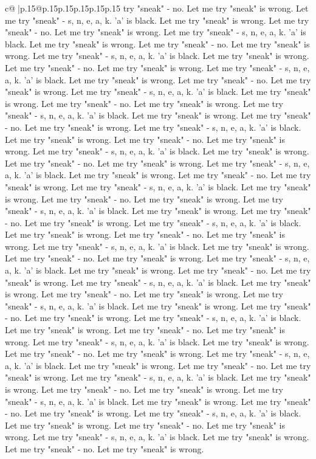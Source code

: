 \documentclass{article}
\begin{document}
{\begin{supertabular}{c@{$\;$}|p{.15\linewidth}@{}p{.15\linewidth}p{.15\linewidth}p{.15\linewidth}p{.15\linewidth}p{.15\linewidth}}
{{{try "sneak" {-} no. Let me try "sneak" is wrong. Let me try "sneak" {-} s, n, e, a, k. 'a' is black. Let me try "sneak" is wrong. Let me try "sneak" {-} no. Let me try "sneak" is wrong. Let me try "sneak" {-} s, n, e, a, k. 'a' is black. Let me try "sneak" is wrong. Let me try "sneak" {-} no. Let me try "sneak" is wrong. Let me try "sneak" {-} s, n, e, a, k. 'a' is black. Let me try "sneak" is wrong. Let me try "sneak" {-} no. Let me try "sneak" is wrong. Let me try "sneak" {-} s, n, e, a, k. 'a' is black. Let me try "sneak" is wrong. Let me try "sneak" {-} no. Let me try "sneak" is wrong. Let me try "sneak" {-} s, n, e, a, k. 'a' is black. Let me try "sneak" is wrong. Let me try "sneak" {-} no. Let me try "sneak" is wrong. Let me try "sneak" {-} s, n, e, a, k. 'a' is black. Let me try "sneak" is wrong. Let me try "sneak" {-} no. Let me try "sneak" is wrong. Let me try "sneak" {-} s, n, e, a, k. 'a' is black. Let me try "sneak" is wrong. Let me try "sneak" {-} no. Let me try "sneak" is wrong. Let me try "sneak" {-} s, n, e, a, k. 'a' is black. Let me try "sneak" is wrong. Let me try "sneak" {-} no. Let me try "sneak" is wrong. Let me try "sneak" {-} s, n, e, a, k. 'a' is black. Let me try "sneak" is wrong. Let me try "sneak" {-} no. Let me try "sneak" is wrong. Let me try "sneak" {-} s, n, e, a, k. 'a' is black. Let me try "sneak" is wrong. Let me try "sneak" {-} no. Let me try "sneak" is wrong. Let me try "sneak" {-} s, n, e, a, k. 'a' is black. Let me try "sneak" is wrong. Let me try "sneak" {-} no. Let me try "sneak" is wrong. Let me try "sneak" {-} s, n, e, a, k. 'a' is black. Let me try "sneak" is wrong. Let me try "sneak" {-} no. Let me try "sneak" is wrong. Let me try "sneak" {-} s, n, e, a, k. 'a' is black. Let me try "sneak" is wrong. Let me try "sneak" {-} no. Let me try "sneak" is wrong. Let me try "sneak" {-} s, n, e, a, k. 'a' is black. Let me try "sneak" is wrong. Let me try "sneak" {-} no. Let me try "sneak" is wrong. Let me try "sneak" {-} s, n, e, a, k. 'a' is black. Let me try "sneak" is wrong. Let me try "sneak" {-} no. Let me try "sneak" is wrong. Let me try "sneak" {-} s, n, e, a, k. 'a' is black. Let me try "sneak" is wrong. Let me try "sneak" {-} no. Let me try "sneak" is wrong. Let me try "sneak" {-} s, n, e, a, k. 'a' is black. Let me try "sneak" is wrong. Let me try "sneak" {-} no. Let me try "sneak" is wrong. Let me try "sneak" {-} s, n, e, a, k. 'a' is black. Let me try "sneak" is wrong. Let me try "sneak" {-} no. Let me try "sneak" is wrong. Let me try "sneak" {-} s, n, e, a, k. 'a' is black. Let me try "sneak" is wrong. Let me try "sneak" {-} no. Let me try "sneak" is wrong. Let me try "sneak" {-} s, n, e, a, k. 'a' is black. Let me try "sneak" is wrong. Let me try "sneak" {-} no. Let me try "sneak" is wrong. Let me try "sneak" {-} s, n, e, a, k. 'a' is black. Let me try "sneak" is wrong. Let me try "sneak" {-} no. Let me try "sneak" is wrong. Let me try "sneak" {-} s, n, e, a, k. 'a' is black. Let me try "sneak" is wrong. Let me try "sneak" {-} no. Let me try "sneak" is wrong. Let me try "sneak" {-} s, n, e, a, k. 'a' is black. Let me try "sneak" is wrong. Let me try "sneak" {-} no. Let me try "sneak" is wrong. }}}
\end{supertabular}}
\end{document}
